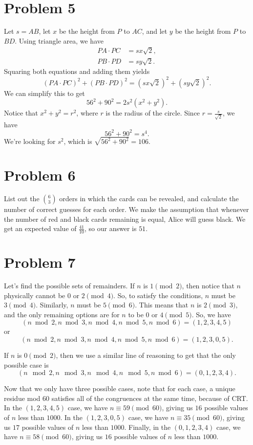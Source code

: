 \documentclass{scrartcl}
\begin{document}
\section*{Problem 5}
Let $s = AB$, let $x$ be the height from $P$ to $AC$, and let $y$ be the height from $P$ to $BD$.
Using triangle area, we have
\begin{align*}
PA \cdot PC &= sx \sqrt 2, \\
PB \cdot PD &= sy \sqrt 2.
\end{align*}
Squaring both equations and adding them yields
\[ (PA \cdot PC)^2 + (PB \cdot PD)^2 = (sx \sqrt 2)^2 + (sy \sqrt 2)^2. \]
We can simplify this to get
\[ 56^2 + 90^2 = 2s^2 (x^2 + y^2). \]
Notice that $x^2 + y^2 = r^2$, where $r$ is the radius of the circle.
Since $r = \frac{s}{\sqrt 2}$, we have
\[ 56^2 + 90^2 = s^4. \]
We're looking for $s^2$, which is $\sqrt{56^2 + 90^2} = \boxed{106}$.
\section*{Problem 6}
List out the $\binom63$ orders in which the cards can be revealed,
and calculate the number of correct guesses for each order.
We make the assumption that whenever the number of red and black cards
remaining is equal, Alice will guess black.
We get an expected value of $\frac{41}{10}$, so our answer is $\boxed{51}$.
\section*{Problem 7}
Let's find the possible sets of remainders.
If $n$ is $1 \pmod{2}$, then notice that $n$ physically
cannot be $0$ or $2 \pmod{4}$.
So, to satisfy the conditions, $n$ must be $3 \pmod{4}$.
Similarly, $n$ must be $5 \pmod{6}$.
This means that $n$ is $2 \pmod{3}$,
and the only remaining options are for $n$ to be $0$ or $4 \pmod{5}$.
So, we have
\[ (n \bmod 2, n \bmod 3, n \bmod 4, n \bmod 5, n \bmod 6) = (1,2,3,4,5) \]
or
\[ (n \bmod 2, n \bmod 3, n \bmod 4, n \bmod 5, n \bmod 6) = (1,2,3,0,5). \]

If $n$ is $0 \pmod{2}$,
then we use a similar line of reasoning to get that
the only possible case is
\[ (n \mod 2, n \mod 3, n \mod 4, n \mod 5, n \bmod 6) = (0,1,2,3,4). \]

Now that we only have three possible cases,
note that for each case, a unique residue mod $60$ satisfies all of the congruences
at the same time, because of CRT.
In the $(1,2,3,4,5)$ case, we have $n \equiv 59 \pmod{60}$, giving us $16$ possible values
of $n$ less than $1000$.
In the $(1,2,3,0,5)$ case, we have $n \equiv 35 \pmod{60}$, giving us $17$ possible values
of $n$ less than $1000$.
Finally, in the $(0,1,2,3,4)$ case, we have $n \equiv 58 \pmod{60}$,
giving us $16$ possible values of $n$ less than $1000$.
\end{document}
